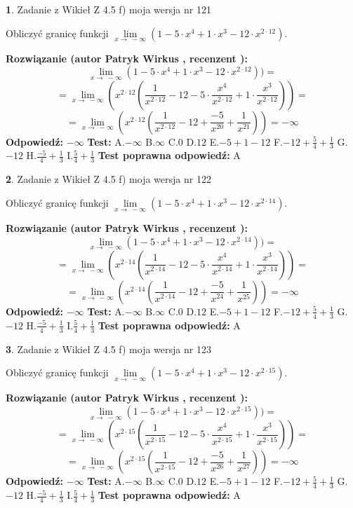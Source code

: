 \documentclass[12pt, a4paper]{article}
\theoremstyle{definition} %
\newtheorem{zad}{}
\newcommand{\zadStart}[1]{\begin{zad}#1\newline}
\newcommand{\zadStop}{\end{zad}}
\newcommand{\rozwStart}[2]{\noindent \textbf{Rozwiązanie (autor #1 , recenzent #2): }\newline}
\newcommand{\rozwStop}{\newline}
\newcommand{\odpStart}{\noindent \textbf{Odpowiedź:}\newline}
\newcommand{\odpStop}{\newline}
\newcommand{\testStart}{\noindent \textbf{Test:}\newline}
\newcommand{\testStop}{\newline}
\newcommand{\kluczStart}{\noindent \textbf{Test poprawna odpowiedź:}\newline}
\newcommand{\kluczStop}{\newline}
\begin{document}
\zadStart{Zadanie z Wikieł Z 4.5 f) moja wersja nr 121}



Obliczyć granicę funkcji  $\lim\limits_{x\to\ -\infty}(1 - 5 \cdot x^{4}+1 \cdot x^{3}- 12 \cdot x^{2\cdot12})$.
\zadStop
\rozwStart{Patryk Wirkus}{}
$$\lim\limits_{x\to\ -\infty}(1 - 5 \cdot x^{4}+1 \cdot x^{3}- 12 \cdot x^{2\cdot12}))=$$
$$=\lim\limits_{x\to\ -\infty}(x^{2\cdot12}(\frac{1}{x^{2\cdot12}}-12 -5 \cdot \frac{x^{4}}{x^{2\cdot12}}+1 \cdot \frac{x^{3}}{x^{2\cdot12}}))=$$
$$=\lim\limits_{x\to\ -\infty}(x^{2\cdot12}(\frac{1}{x^{2\cdot12}}-12 + \frac{-5}{x^{20}}+ \frac{1}{x^{21}}))=-\infty$$
\rozwStop
\odpStart
$-\infty$
\odpStop
\testStart
A.$-\infty$ B.$\infty$ C.$0$ D.$12$ E.$-5 + 1 - 12$
F.$-12+\frac{5}{4}+\frac{1}{3}$ G.$-12$
H.$\frac{-5}{4}+\frac{1}{3}$
I.$\frac{5}{4}+\frac{1}{3}$
\testStop
\kluczStart
A
\kluczStop



\zadStart{Zadanie z Wikieł Z 4.5 f) moja wersja nr 122}



Obliczyć granicę funkcji  $\lim\limits_{x\to\ -\infty}(1 - 5 \cdot x^{4}+1 \cdot x^{3}- 12 \cdot x^{2\cdot14})$.
\zadStop
\rozwStart{Patryk Wirkus}{}
$$\lim\limits_{x\to\ -\infty}(1 - 5 \cdot x^{4}+1 \cdot x^{3}- 12 \cdot x^{2\cdot14}))=$$
$$=\lim\limits_{x\to\ -\infty}(x^{2\cdot14}(\frac{1}{x^{2\cdot14}}-12 -5 \cdot \frac{x^{4}}{x^{2\cdot14}}+1 \cdot \frac{x^{3}}{x^{2\cdot14}}))=$$
$$=\lim\limits_{x\to\ -\infty}(x^{2\cdot14}(\frac{1}{x^{2\cdot14}}-12 + \frac{-5}{x^{24}}+ \frac{1}{x^{25}}))=-\infty$$
\rozwStop
\odpStart
$-\infty$
\odpStop
\testStart
A.$-\infty$ B.$\infty$ C.$0$ D.$12$ E.$-5 + 1 - 12$
F.$-12+\frac{5}{4}+\frac{1}{3}$ G.$-12$
H.$\frac{-5}{4}+\frac{1}{3}$
I.$\frac{5}{4}+\frac{1}{3}$
\testStop
\kluczStart
A
\kluczStop



\zadStart{Zadanie z Wikieł Z 4.5 f) moja wersja nr 123}



Obliczyć granicę funkcji  $\lim\limits_{x\to\ -\infty}(1 - 5 \cdot x^{4}+1 \cdot x^{3}- 12 \cdot x^{2\cdot15})$.
\zadStop
\rozwStart{Patryk Wirkus}{}
$$\lim\limits_{x\to\ -\infty}(1 - 5 \cdot x^{4}+1 \cdot x^{3}- 12 \cdot x^{2\cdot15}))=$$
$$=\lim\limits_{x\to\ -\infty}(x^{2\cdot15}(\frac{1}{x^{2\cdot15}}-12 -5 \cdot \frac{x^{4}}{x^{2\cdot15}}+1 \cdot \frac{x^{3}}{x^{2\cdot15}}))=$$
$$=\lim\limits_{x\to\ -\infty}(x^{2\cdot15}(\frac{1}{x^{2\cdot15}}-12 + \frac{-5}{x^{26}}+ \frac{1}{x^{27}}))=-\infty$$
\rozwStop
\odpStart
$-\infty$
\odpStop
\testStart
A.$-\infty$ B.$\infty$ C.$0$ D.$12$ E.$-5 + 1 - 12$
F.$-12+\frac{5}{4}+\frac{1}{3}$ G.$-12$
H.$\frac{-5}{4}+\frac{1}{3}$
I.$\frac{5}{4}+\frac{1}{3}$
\testStop
\kluczStart
A
\kluczStop
\end{document}
